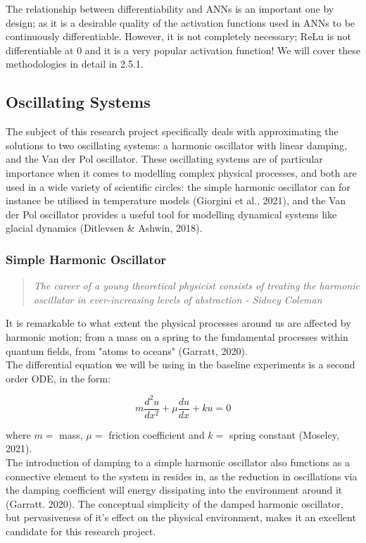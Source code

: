\documentclass[12pt, openany]{book}
\begin{document}
The relationship between differentiability and ANNs is an important one by design; as it is a desirable quality of the activation functions used in ANNs to be continuously differentiable. However, it is not completely necessary; ReLu is not differentiable at 0 and it is a very popular activation function! We will cover these methodologies in detail in 2.5.1.

\subsection{Oscillating Systems}

The subject of this research project specifically deals with approximating the solutions to two oscillating systems: a harmonic oscillator with linear damping, and the Van der Pol oscillator. These oscillating systems are of particular importance when it comes to modelling complex physical processes, and both are used in a wide variety of scientific circles: the simple harmonic oscillator can for instance be utilised in temperature models (Giorgini et al., 2021), and the Van der Pol oscillator provides a useful tool for modelling dynamical systems like glacial dynamics (Ditlevsen {\&} Ashwin, 2018).

\subsubsection{Simple Harmonic Oscillator}

\begin{quote}
    \textit{The career of a young theoretical physicist consists of treating the harmonic oscillator in ever-increasing levels of abstraction - Sidney Coleman}
\end{quote}

It is remarkable to what extent the physical processes around us are affected by harmonic motion; from a mass on a spring to the fundamental processes within quantum fields, from "atoms to oceans" (Garratt, 2020). \\

The differential equation we will be using in the baseline experiments is a second order ODE, in the form:

\[m\frac{d^2u}{dx^2}+\mu\frac{du}{dx}+ku=0\]

where \(m =\) mass, \(\mu =\) friction coefficient and \(k = \) spring constant (Moseley, 2021). \\

The introduction of damping to a simple harmonic oscillator also functions as a connective element to the system in resides in, as the reduction in oscillations via the damping coefficient will energy dissipating into the environment around it (Garratt. 2020). The conceptual simplicity of the damped harmonic oscillator, but pervasiveness of it's effect on the physical environment, makes it an excellent candidate for this research project. \\
\end{document}
